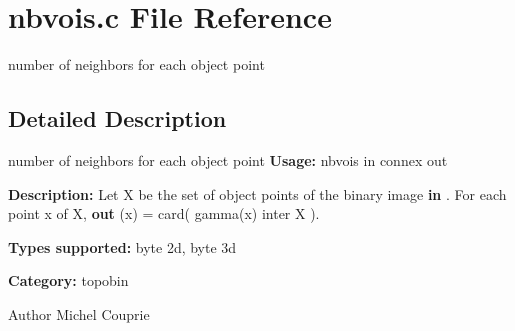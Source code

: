 \section{nbvois.c File Reference}
\label{nbvois_8c}


number of neighbors for each object point  




\subsection{Detailed Description}
number of neighbors for each object point {\bfseries Usage:} nbvois in connex out

{\bfseries Description:} Let X be the set of object points of the binary image {\bfseries in} . For each point x of X, {\bfseries out} (x) = card( gamma(x) inter X ).

{\bfseries Types supported:} byte 2d, byte 3d

{\bfseries Category:} topobin

\begin{DoxyAuthor}{Author}
Michel Couprie 
\end{DoxyAuthor}
